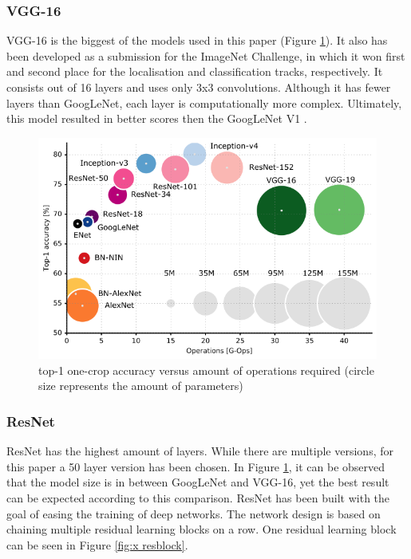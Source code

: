 \documentclass[conference]{IEEEtran}
\begin{document}
\subsubsection{VGG-16}
VGG-16 is the biggest of the models used in this paper (Figure \ref{fig:x mode size}).
It also has been developed as a submission for the ImageNet Challenge, in which it won first and second place for the localisation and classification tracks, respectively.
It consists out of 16 layers and uses only 3x3 convolutions. Although it has fewer layers than GoogLeNet, each layer is computationally more complex. 
Ultimately, this model resulted in better scores then the GoogLeNet V1 \cite{simonyan_very_2015}.

\begin{figure}[!htbp]
    \centering
    \includegraphics[scale=0.35]{img/model_sizes.png}
    \caption{top-1 one-crop accuracy versus amount of operations required (circle size represents the amount of parameters) \cite{canziani_analysis_2017}}
    \label{fig:x mode size}
\end{figure}

\subsubsection{ResNet}
ResNet has the highest amount of layers. 
While there are multiple versions, for this paper a 50 layer version has been chosen.
In Figure \ref{fig:x mode size}, it can be observed that the model size is in between GoogLeNet and VGG-16, yet the best result can be expected according to this comparison.
ResNet has been built with the goal of easing the training of deep networks. The network design is based on chaining multiple residual learning blocks on a row. One residual learning block can be seen in Figure \ref{fig:x resblock}. \cite{he_deep_2015}
\end{document}
